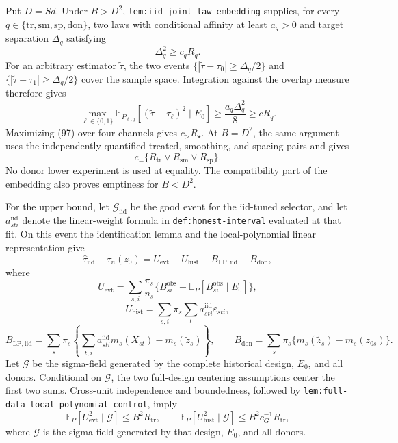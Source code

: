 Put \(D=Sd\).  Under \(B>D^2\), \texttt{lem:iid-joint-law-embedding} supplies, for every
\(q\in\{\mathrm{tr},\mathrm{sm},\mathrm{sp},\mathrm{don}\}\), two laws with conditional affinity at least \(a_q>0\) and target separation \(\Delta_q\) satisfying
\[
\Delta_q^2\geq c_qR_q.
\tag{96}
\]
For an arbitrary estimator \(\widetilde\tau\), the two events
\(\{|\widetilde\tau-\tau_0|\geq\Delta_q/2\}\) and
\(\{|\widetilde\tau-\tau_1|\geq\Delta_q/2\}\) cover the sample space.  Integration against the overlap measure therefore gives
\[
\max_{\ell\in\{0,1\}}
\mathbb E_{P_{\ell,q}}[(\widetilde\tau-\tau_\ell)^2\mid E_0]
\geq\frac{a_q\Delta_q^2}{8}
\geq cR_q.
\tag{97}
\]
Maximizing (97) over four channels gives \(c_{>}R_\star\).  At \(B=D^2\), the same argument uses the independently quantified treated, smoothing, and spacing pairs and gives
\[
c_{=}\{R_{\mathrm{tr}}\vee R_{\mathrm{sm}}\vee R_{\mathrm{sp}}\}.
\tag{98}
\]
No donor lower experiment is used at equality.  The compatibility part of the embedding also proves emptiness for \(B<D^2\).

For the upper bound, let \(\mathcal G_{\mathrm{iid}}\) be the good event for the iid-tuned selector, and let \(a_{sti}^{\mathrm{iid}}\) denote the linear-weight formula in \texttt{def:honest-interval} evaluated at that fit.  On this event the identification lemma and the local-polynomial linear representation give
\[
\widehat\tau_{\mathrm{iid}}-\tau_n(z_0)
=U_{\mathrm{evt}}-U_{\mathrm{hist}}
-B_{\mathrm{LP,iid}}-B_{\mathrm{don}},
\tag{99}
\]
where
\[
U_{\mathrm{evt}}
=\sum_{s,i}\frac{\pi_s}{n_s}
\{B_{si}^{\mathrm{obs}}-\mathbb E_P[B_{si}^{\mathrm{obs}}\mid E_0]\},
\]
\[
U_{\mathrm{hist}}
=\sum_{s,i}\pi_s\sum_ta_{sti}^{\mathrm{iid}}\varepsilon_{sti},
\]
\[
B_{\mathrm{LP,iid}}
=\sum_s\pi_s\left\{\sum_{t,i}a_{sti}^{\mathrm{iid}}m_s(X_{st})
-m_s(\widetilde z_s)\right\},
\qquad
B_{\mathrm{don}}
=\sum_s\pi_s\{m_s(\widetilde z_s)-m_s(z_{0s})\}.
\]
Let \(\mathscr G\) be the sigma-field generated by the complete historical design, \(E_0\), and all donors.  Conditional on \(\mathscr G\), the two full-design centering assumptions center the first two sums.  Cross-unit independence and boundedness, followed by \texttt{lem:full-data-local-polynomial-control}, imply
\[
\mathbb E_P[U_{\mathrm{evt}}^2\mid\mathscr G]
\leq B^2R_{\mathrm{tr}},
\qquad
\mathbb E_P[U_{\mathrm{hist}}^2\mid\mathscr G]
\leq B^2c_G^{-1}R_{\mathrm{tr}},
\tag{100}
\]
where \(\mathscr G\) is the sigma-field generated by that design, \(E_0\), and all donors.

